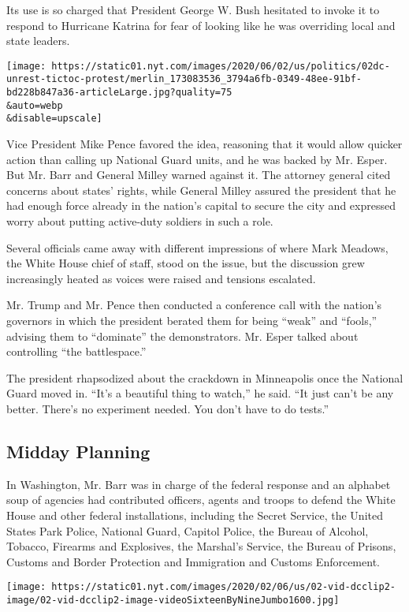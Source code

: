 Its use is so charged that President George W. Bush hesitated to invoke
it to respond to Hurricane Katrina for fear of looking like he was
overriding local and state leaders.

\texttt{[image: https://static01.nyt.com/images/2020/06/02/us/politics/02dc-unrest-tictoc-protest/merlin\_173083536\_3794a6fb-0349-48ee-91bf-bd228b847a36-articleLarge.jpg?quality=75\\\&auto=webp\\\&disable=upscale]}

Vice President Mike Pence favored the idea, reasoning that it would
allow quicker action than calling up National Guard units, and he was
backed by Mr. Esper. But Mr. Barr and General Milley warned against it.
The attorney general cited concerns about states' rights, while General
Milley assured the president that he had enough force already in the
nation's capital to secure the city and expressed worry about putting
active-duty soldiers in such a role.

Several officials came away with different impressions of where Mark
Meadows, the White House chief of staff, stood on the issue, but the
discussion grew increasingly heated as voices were raised and tensions
escalated.

Mr. Trump and Mr. Pence then conducted a conference call with the
nation's governors in which the president berated them for being
``weak'' and ``fools,'' advising them to ``dominate'' the demonstrators.
Mr. Esper talked about controlling ``the battlespace.''

The president rhapsodized about the crackdown in Minneapolis once the
National Guard moved in. ``It's a beautiful thing to watch,'' he said.
``It just can't be any better. There's no experiment needed. You don't
have to do tests.''

\hypertarget{midday-planning}{%
\subsection{Midday Planning}\label{midday-planning}}

In Washington, Mr. Barr was in charge of the federal response and an
alphabet soup of agencies had contributed officers, agents and troops to
defend the White House and other federal installations, including the
Secret Service, the United States Park Police, National Guard, Capitol
Police, the Bureau of Alcohol, Tobacco, Firearms and Explosives, the
Marshal's Service, the Bureau of Prisons, Customs and Border Protection
and Immigration and Customs Enforcement.

\texttt{[image: https://static01.nyt.com/images/2020/02/06/us/02-vid-dcclip2-image/02-vid-dcclip2-image-videoSixteenByNineJumbo1600.jpg]}

